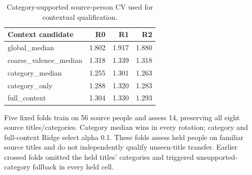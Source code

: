\begin{table}[tbp]
\centering
\small
\caption{Category-supported source-person CV used for contextual qualification.}
\label{tab:sourcecv}
\begin{tabular}{lrrr}
\toprule
Context candidate & R0 & R1 & R2 \\
\midrule
global\_median & 1.802 & 1.917 & 1.880 \\
coarse\_valence\_median & 1.318 & 1.339 & 1.318 \\
category\_median & 1.255 & 1.301 & 1.263 \\
category\_only & 1.288 & 1.320 & 1.283 \\
full\_context & 1.304 & 1.330 & 1.293 \\
\bottomrule
\end{tabular}
\par\medskip\begin{minipage}{0.97\linewidth}\footnotesize Five fixed folds train on 56 source people and assess 14, preserving all eight source titles/categories. Category median wins in every rotation; category and full-context Ridge select alpha 0.1. These folds assess held people on familiar source titles and do not independently qualify unseen-title transfer. Earlier crossed folds omitted the held titles' categories and triggered unsupported-category fallback in every held cell.\end{minipage}
\end{table}
